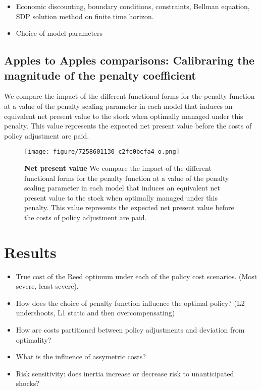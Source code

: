 \documentclass[review, 12pt]{elsarticle}
\begin{document}
\begin{itemize}
\item   Economic discounting, boundary conditions, constraints, Bellman equation, SDP solution method on finite time horizon.  
\item   Choice of model parameters 
\end{itemize}


\subsection{Apples to Apples comparisons: Calibraring the magnitude of the penalty coefficient}

We compare the impact of the different functional forms for the penalty
function at a value of the penalty scaling parameter in each model that
induces an equivalent net present value to the stock when optimally
managed under this penalty. This value represents the expected net
present value before the costs of policy adjustment are paid.

  \begin{figure}
    \begin{center}
\texttt{[image: figure/7258601130\_c2fc0bcfa4\_o.png]}
\caption{\textbf{Net present value} We compare the impact of the different functional forms for the penalty
function at a value of the penalty scaling parameter in each model that
induces an equivalent net present value to the stock when optimally
managed under this penalty. This value represents the expected net
present value before the costs of policy adjustment are paid.}
\end{center}
\end{figure}


\section{Results}

\begin{itemize}
  \item True cost of the Reed optimum under each of the policy cost scenarios.  (Most severe, least severe).   
  \item How does the choice of penalty function influence the optimal policy? (L2 undershoots, L1 static and then overcompensating)
  \item How are costs partitioned between policy adjustments and deviation from optimality? 
  \item What is the influence of assymetric costs?
  \item Risk sensitivity: does inertia increase or decrease risk to unanticipated shocks?
\end{itemize}
\end{document}
